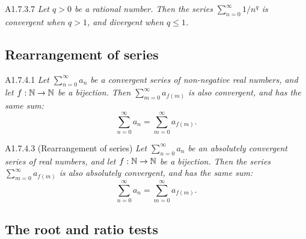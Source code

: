 \begin{corollary}{A1.7.3.7}
    \emph{Let $q > 0$ be a rational number. Then the series $\sum_{n=0}^{\infty} 1/n^q$
    is convergent when $q > 1$, and divergent when $q \leq 1$.}
\end{corollary}

\subsection{Rearrangement of series}
\begin{proposition}{A1.7.4.1}
    \emph{Let $\sum_{n=0}^{\infty} a_n$ be a convergent series of non-negative real
    numbers, and let $f: \mathbb{N} \rightarrow \mathbb{N}$ be a bijection. Then
    $\sum_{m=0}^{\infty} a_{f(m)}$ is also convergent, and has the same sum:
    \begin{equation*}
        \sum_{n=0}^{\infty} a_n = \sum_{m=0}^{\infty} a_{f(m)}.
    \end{equation*}
    }
\end{proposition}

\begin{proposition}{A1.7.4.3}
    (Rearrangement of series) \emph{Let $\sum_{n=0}^{\infty} a_n$ be an absolutely
    convergent series of real numbers, and let $f: \mathbb{N} \rightarrow \mathbb{N}$
    be a bijection. Then the series $\sum_{m=0}^{\infty} a_{f(m)}$ is also absolutely
    convergent, and has the same sum:
    \begin{equation*}
        \sum_{n=0}^{\infty} a_n = \sum_{m=0}^{\infty} a_{f(m)}.
    \end{equation*}
    }
\end{proposition}

\subsection{The root and ratio tests}

